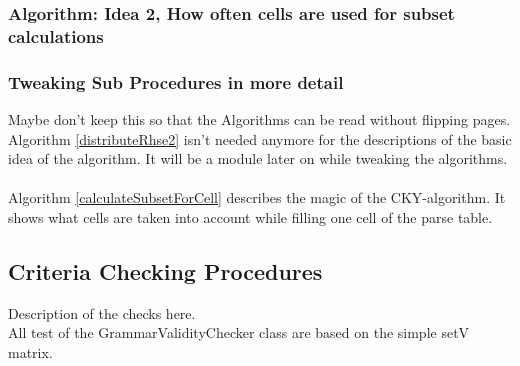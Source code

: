 \subsubsection{Algorithm: Idea 2, How often cells are used for subset calculations}

\pagebreak

\subsubsection{Tweaking Sub Procedures in more detail}
Maybe don't keep this so that the Algorithms can be read without flipping pages.\\

\noindent
{}
Algorithm \ref{distributeRhse2} isn't needed anymore for the descriptions of the basic idea of the algorithm. It will be a module later on while tweaking the algorithms.
\\
\\
Algorithm \ref{calculateSubsetForCell} describes the magic of the CKY-algorithm. It shows what cells are taken into account while filling one cell of the parse table.

\pagebreak

\subsection{Criteria Checking Procedures}
\noindent Description of the checks here. \\
\noindent All test of the GrammarValidityChecker class are based on the simple setV matrix. \\

